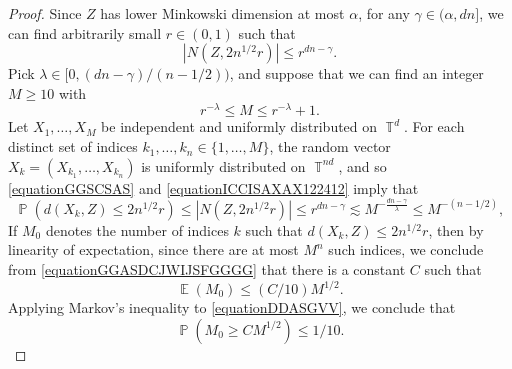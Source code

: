 \documentclass[dvipsnames,letterpaper,12pt]{article}
\numberwithin{equation}{section}
\DeclareMathOperator{\TT}{\mathbb{T}}
\numberwithin{theorem}{section}
\DeclareMathOperator{\EE}{\mathbb{E}}
\DeclareMathOperator{\PP}{\mathbb{P}}
\begin{document}
\begin{proof}
    Since $Z$ has lower Minkowski dimension at most $\alpha$, for any $\gamma \in (\alpha,dn]$, we can find arbitrarily small $r \in (0,1)$ such that
    \begin{equation} \label{equationGGSCSAS}
        |N(Z, 2 n^{1/2} r)| \leq r^{dn - \gamma}.
    \end{equation}
    Pick $\lambda \in [0,(dn - \gamma)/(n-1/2))$, and suppose that we can find an integer $M \geq 10$ with
    \begin{equation} \label{equationICCISAXAX122412}
        r^{-\lambda} \leq M \leq r^{-\lambda} + 1.
    \end{equation}
    Let $X_1, \dots, X_M$ be independent and uniformly distributed on $\TT^d$. For each distinct set of indices $k_1, \dots, k_n \in \{ 1, \dots, M \}$, the random vector $X_k = (X_{k_1}, \dots, X_{k_n})$ is uniformly distributed on $\TT^{nd}$, and so \eqref{equationGGSCSAS} and \eqref{equationICCISAXAX122412} imply that
    \begin{equation} \label{equationGGASDCJWIJSFGGGG}
        \PP(d(X_k,Z) \leq 2n^{1/2} r) \leq |N(Z,2n^{1/2}r)| \leq r^{dn - \gamma} \lesssim M^{- \frac{dn - \gamma}{\lambda}} \leq M^{-(n-1/2)},
    \end{equation}
    If $M_0$ denotes the number of indices $k$ such that $d(X_k,Z) \leq 2n^{1/2}r$, then by linearity of expectation, since there are at most $M^n$ such indices, we conclude from \eqref{equationGGASDCJWIJSFGGGG} that there is a constant $C$ such that
    \begin{equation} \label{equationDDASGVV}
        \EE(M_0) \leq (C/10) M^{1/2}.
    \end{equation}
    Applying Markov's inequality to \eqref{equationDDASGVV}, we conclude that
    \begin{equation} \label{equationFGGGSC}
        \PP(M_0 \geq C M^{1/2}) \leq 1/10.
    \end{equation}

\end{proof}
\end{document}
